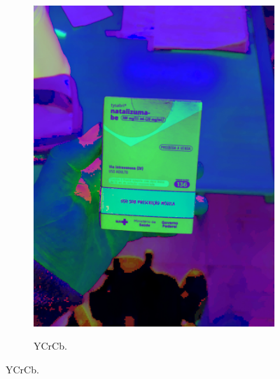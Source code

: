 \begin{figure}[htb]
\begin{subfigure}[t]{0.22\textwidth}
        \includegraphics[width=\linewidth]{../pictures/tysabri_HSV.jpg}
    \end{subfigure}
    \hfill
    \begin{subfigure}[t]{0.22\textwidth}
        \centering
        \caption{YCrCb.}

\end{subfigure}
\end{figure}

